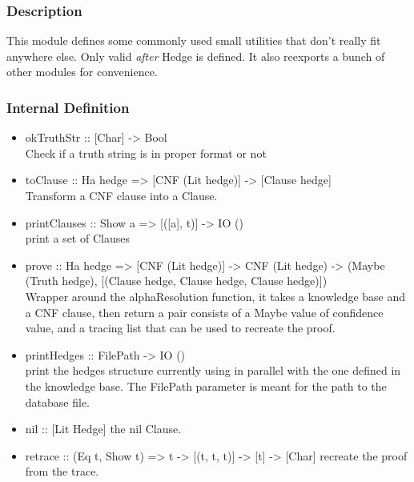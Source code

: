 \documentclass[../gr-final.tex]{subfiles}
\begin{document}
\subsubsection{Description}
This module defines some commonly used small utilities that don't
really fit anywhere else. Only valid {\em after} Hedge is
defined. It also reexports a bunch of other modules for
convenience.
\subsubsection{Internal Definition}
\begin{itemize}
        \item okTruthStr :: [Char] -> Bool\\
         Check if a truth string is in proper format or not
        \item toClause :: Ha hedge => [CNF (Lit hedge)] ->
                [Clause hedge]\\
              Transform a CNF clause into a Clause.  
        \item printClauses :: Show a => [([a], t)] -> IO ()\\
                print a set of Clauses
        \item prove :: Ha hedge => [CNF (Lit hedge)] -> CNF (Lit hedge) ->
           (Maybe (Truth hedge), [(Clause hedge, Clause hedge, Clause hedge)])\\
            Wrapper around the alphaResolution function, it takes
            a knowledge base and a CNF clause, then return a pair
            consists of a Maybe value of confidence value, and a
            tracing list that can be used to recreate the proof.          
        \item printHedges :: FilePath -> IO ()\\
                print the hedges structure currently using in
                parallel with the one defined in the knowledge base. The FilePath
                parameter is meant for the path to the database
                file.
        \item nil :: [Lit Hedge]
                the nil Clause.
        \item retrace :: (Eq t, Show t) => t -> [(t, t, t)] -> [t] -> [Char]
                recreate the proof from the trace.
\end{itemize}
\end{document}
